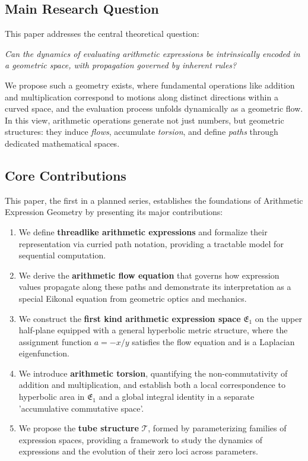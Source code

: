 \documentclass[12pt]{article}
\begin{document}
\subsection{Main Research Question}
This paper addresses the central theoretical question:
\begin{center}
\emph{Can the dynamics of evaluating arithmetic expressions be intrinsically encoded in a geometric space, with propagation governed by inherent rules?}
\end{center}
We propose such a geometry exists, where fundamental operations like addition and multiplication correspond to motions along distinct directions within a curved space, and the evaluation process unfolds dynamically as a geometric flow. In this view, arithmetic operations generate not just numbers, but geometric structures: they induce \emph{flows}, accumulate \emph{torsion}, and define \emph{paths} through dedicated mathematical spaces.

\subsection{Core Contributions}
This paper, the first in a planned series, establishes the foundations of Arithmetic Expression Geometry by presenting its major contributions:
\begin{enumerate}[label=\textbf{C\arabic*.}, leftmargin=*, widest=C5, align=left]
  \item We define \textbf{threadlike arithmetic expressions} and formalize their representation via curried path notation, providing a tractable model for sequential computation.
  \item We derive the \textbf{arithmetic flow equation} that governs how expression values propagate along these paths and demonstrate its interpretation as a special Eikonal equation from geometric optics and mechanics.
  \item We construct the \textbf{first kind arithmetic expression space} \( \mathfrak{E}_1 \) on the upper half-plane equipped with a general hyperbolic metric structure, where the assignment function \( a = -x/y \) satisfies the flow equation and is a Laplacian eigenfunction.
  \item We introduce \textbf{arithmetic torsion}, quantifying the non-commutativity of addition and multiplication, and establish both a local correspondence to hyperbolic area in \( \mathfrak{E}_1 \) and a global integral identity in a separate 'accumulative commutative space'.
  \item We propose the \textbf{tube structure} \( \mathcal{T} \), formed by parameterizing families of expression spaces, providing a framework to study the dynamics of expressions and the evolution of their zero loci across parameters.
\end{enumerate}
\end{document}

